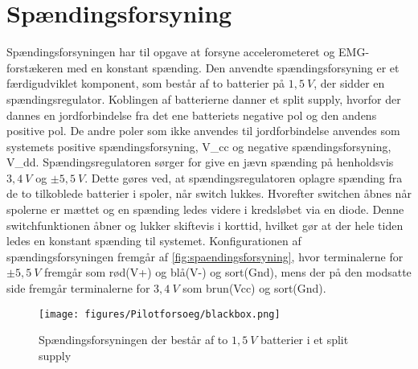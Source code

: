 \section{Spændingsforsyning}
Spændingsforsyningen har til opgave at forsyne accelerometeret og EMG-forstækeren med en konstant spænding. Den anvendte spændingsforsyning er et færdigudviklet komponent, som består af to batterier på $1,5~V$, der sidder en spændingsregulator. Koblingen af batterierne danner et split supply, hvorfor der dannes en jordforbindelse fra det ene batteriets negative pol og den andens positive pol. De andre poler som ikke anvendes til jordforbindelse anvendes som systemets positive spændingsforsyning, {V}_{cc} og negative spændingsforsyning, {V}_{dd}.
Spændingsregulatoren sørger for give en jævn spænding på henholdsvis $3,4~V$ og $\pm 5,5~V$. Dette gøres ved, at spændingsregulatoren oplagre spænding fra de to tilkoblede batterier i spoler, når switch lukkes. Hvorefter switchen åbnes når spolerne er mættet og en spænding ledes videre i kredsløbet via en diode. Denne switchfunktionen åbner og lukker skiftevis i korttid, hvilket gør at der hele tiden ledes en konstant spænding til systemet. 
Konfigurationen af spændingsforsyningen fremgår af \autoref{fig:spaendingsforsyning}, hvor terminalerne for $\pm 5,5~V$ fremgår som rød(V+) og blå(V-) og sort(Gnd), mens der på den modsatte side fremgår terminalerne for $3,4~V$ som brun(Vcc) og sort(Gnd). 


\begin{figure}[H]
\centering
\texttt{[image: figures/Pilotforsoeg/blackbox.png]}
\caption{Spændingsforsyningen der består af to $1,5~V$ batterier i et split supply}
\label{fig:spaendingsforsyning}
\end{figure}
